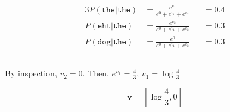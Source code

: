 \documentclass[11pt]{scrartcl}
\newcommand{\vvec}{\ensuremath{\mathbf{v}}}
\begin{document}
\subsection{}

\begin{alignat*}{3}
P(\mathtt{the} | \mathtt{the}) &= \frac{e^{v_1}}{e^0 + e^{v_1} + e^{v_2}} &&= 0.4 \\ 
P(\mathtt{eht} | \mathtt{the}) &= \frac{e^{v_2}}{e^0 + e^{v_1} + e^{v_2}} &&= 0.3 \\ 
P(\mathtt{dog} | \mathtt{the}) &= \frac{e^{0}}{e^0 + e^{v_1} + e^{v_2}} &&= 0.3
\end{alignat*}

\subsection{}

By inspection, $v_2 = 0$. Then, $e^{v_1} = \frac{4}{3}$, $v_1 = \log{\frac{4}{3}}$

\[ \vvec = \left[\log{\frac{4}{3}}, 0\right] \]
\end{document}
